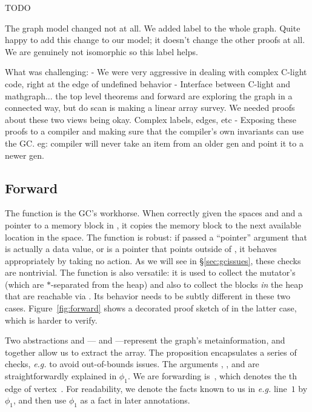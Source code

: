 \hide
{\color{red} TODO

The graph model changed not at all. We added label to the whole graph. Quite happy to add this change to our model; it doesn't change the other proofs at all. We are genuinely not isomorphic so this label helps.

What was challenging:
	- We were very aggressive in dealing with complex C-light code, right at the edge of undefined behavior
	- Interface between C-light and mathgraph... the top level theorems and forward are exploring the graph in a connected way, but do scan is making a linear array survey. We needed proofs about these two views being okay. Complex labels, edges, etc
	- Exposing these proofs to a compiler and making sure that the compiler's own invariants can use the GC. eg: compiler will never take an item from an older gen and point it to a newer gen.
}

\subsection{Forward}
\label{sec:gcforward}

The function  is the GC's workhorse.
When correctly given the spaces  and  and a pointer
 to a memory block in ,
it copies the memory block to the next
available location in the  space.
The function is robust: if passed a ``pointer'' argument
that is actually a data value, or is a pointer that points outside of
, it behaves appropriately by taking no action.
As we will see in \S\ref{sec:gcissues}, these checks are nontrivial.
The function is also versatile: it is used to collect the
mutator's  (which are $*$-separated from the heap)
and also to collect the blocks \emph{in} the heap that are reachable via
. Its behavior needs to be subtly different in these
two cases.
Figure~\ref{fig:forward} shows a decorated proof sketch of 
in the latter case, which is harder to verify.

Two abstractions  
and --- and ---represent the 
graph's metainformation, and together allow us to
extract the  array. The
proposition  encapsulates a series of checks, 
\emph{e.g.} to avoid out-of-bounds issues.
The arguments , , and  are straightforwardly
explained in $\phi_1$. 
We are forwarding
is~, which denotes the th edge of vertex~. 
For readability,
we denote the facts known to us in
\emph{e.g.} line~$1$ by $\phi_1$, and then use $\phi_1$
as a fact in later annotations.

